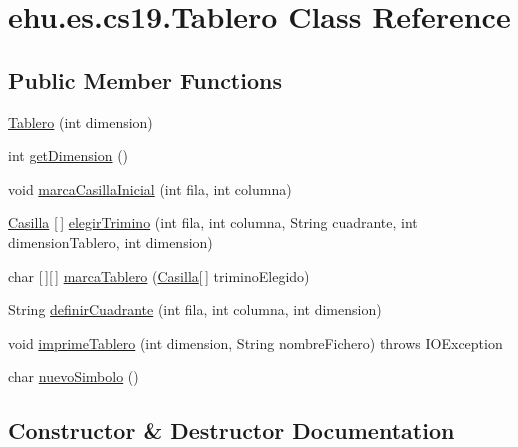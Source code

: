 \hypertarget{classehu_1_1es_1_1cs19_1_1_tablero}{}\section{ehu.\+es.\+cs19.\+Tablero Class Reference}
\label{classehu_1_1es_1_1cs19_1_1_tablero}
\subsection*{Public Member Functions}
\begin{DoxyCompactItemize}
\item 
\mbox{\hyperlink{classehu_1_1es_1_1cs19_1_1_tablero_a0fd0f1e7629ab4a2097e8a2475ea73c2}{Tablero}} (int dimension)
\item 
int \mbox{\hyperlink{classehu_1_1es_1_1cs19_1_1_tablero_acb9024a3118bb11491f6c29520c68bc0}{get\+Dimension}} ()
\item 
void \mbox{\hyperlink{classehu_1_1es_1_1cs19_1_1_tablero_ae11f212fa702b46fabaf56b1a8260ac2}{marca\+Casilla\+Inicial}} (int fila, int columna)
\item 
\mbox{\hyperlink{classehu_1_1es_1_1cs19_1_1_casilla}{Casilla}} \mbox{[}$\,$\mbox{]} \mbox{\hyperlink{classehu_1_1es_1_1cs19_1_1_tablero_addb7e4db7fc892b6b15dd5b3b9bebadc}{elegir\+Trimino}} (int fila, int columna, String cuadrante, int dimension\+Tablero, int dimension)
\item 
char \mbox{[}$\,$\mbox{]}\mbox{[}$\,$\mbox{]} \mbox{\hyperlink{classehu_1_1es_1_1cs19_1_1_tablero_a902d0a64d3f7648130c66cfa4d1bca4d}{marca\+Tablero}} (\mbox{\hyperlink{classehu_1_1es_1_1cs19_1_1_casilla}{Casilla}}\mbox{[}$\,$\mbox{]} trimino\+Elegido)
\item 
String \mbox{\hyperlink{classehu_1_1es_1_1cs19_1_1_tablero_a21bf3bd6c575b09f153c51b2f50d1488}{definir\+Cuadrante}} (int fila, int columna, int dimension)
\item 
void \mbox{\hyperlink{classehu_1_1es_1_1cs19_1_1_tablero_a0a3dba73a12a398c2c3d72577027dc7a}{imprime\+Tablero}} (int dimension, String nombre\+Fichero)  throws I\+O\+Exception 
\item 
char \mbox{\hyperlink{classehu_1_1es_1_1cs19_1_1_tablero_a35427ed7692ad59556f26281d22625fe}{nuevo\+Simbolo}} ()
\end{DoxyCompactItemize}


\subsection{Constructor \& Destructor Documentation}
\mbox{\label{classehu_1_1es_1_1cs19_1_1_tablero_a0fd0f1e7629ab4a2097e8a2475ea73c2}} 
